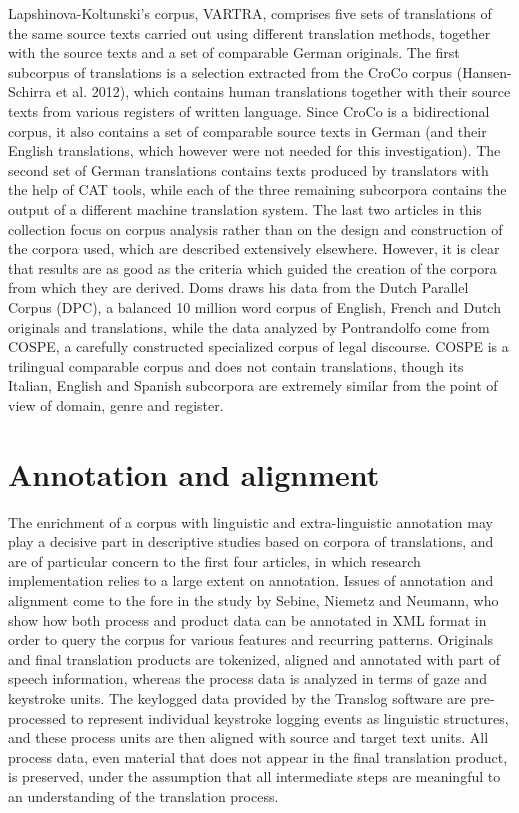 \begin{refsection}
Lapshinova-Koltunski’s corpus, VARTRA, comprises five sets of translations of the same source texts carried out using different translation methods, together with the source texts and a set of comparable German originals. The first subcorpus of translations is a selection extracted from the CroCo corpus (Hansen-Schirra et al. 2012), which contains human translations together with their source texts from various registers of written language. Since CroCo is a bidirectional corpus, it also contains a set of comparable source texts in German (and their English translations, which however were not needed for this investigation). The second set of German translations contains texts produced by translators with the help of CAT tools, while each of the three remaining subcorpora contains the output of a different machine translation system. The last two articles in this collection focus on corpus analysis rather than on the design and construction of the corpora used, which are described extensively elsewhere. However, it is clear that results are as good as the criteria which guided the creation of the corpora from which they are derived. Doms draws his data from the Dutch Parallel Corpus (DPC), a balanced 10 million word corpus of English, French and Dutch originals and translations, while the data analyzed by Pontrandolfo come from COSPE, a carefully constructed specialized corpus of legal discourse. COSPE is a trilingual comparable corpus and does not contain translations, though its Italian, English and Spanish subcorpora are extremely similar from the point of view of domain, genre and register.

\section{Annotation and alignment}
The enrichment of a corpus with linguistic and extra-linguistic annotation may play a decisive part in descriptive studies based on corpora of translations, and are of particular concern to the first four articles, in which research implementation relies to a large extent on annotation. Issues of annotation and alignment come to the fore in the study by Sebine, Niemetz and Neumann, who show how both process and product data can be annotated in XML format in order to query the corpus for various features and recurring patterns. Originals and final translation products are tokenized, aligned and annotated with part of speech information, whereas the process data is analyzed in terms of gaze and keystroke units. The keylogged data provided by the Translog software are pre-processed to represent individual keystroke logging events as linguistic structures, and these process units are then aligned with source and target text units. All process data, even material that does not appear in the final translation product, is preserved, under the assumption that all intermediate steps are meaningful to an understanding of the translation process. 


\end{refsection}
